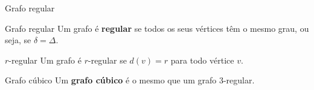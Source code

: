 \documentclass[xcolor=dvipsnames,table]{beamer}
\begin{document}
	\begin{frame}{Grafo regular}
		\begin{block}{Grafo regular}
			Um grafo é {\bf regular} se todos os seus vértices têm o mesmo grau, ou seja, se $\delta = \Delta$.
		\end{block} \pause
		\begin{block}{$r$-regular}
			Um grafo é $r$-regular se $d(v) = r$ para todo vértice $v$.
		\end{block} \pause
		\begin{block}{Grafo cúbico}
			Um {\bf grafo cúbico} é o mesmo que um grafo 3-regular.
		\end{block}
	\end{frame}
	
	\begin{frame}
		\titlepage
	\end{frame}
	
\end{document}
